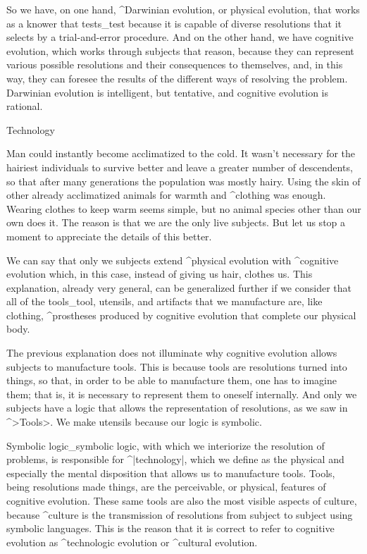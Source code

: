 So we have, on one hand, ^{Darwinian evolution}, or physical evolution,
that works as a knower that tests_{test} because it is capable of
diverse resolutions that it selects by a trial-and-error procedure. And
on the other hand, we have cognitive evolution, which works through
subjects that reason, because they can represent various possible
resolutions and their consequences to themselves, and, in this way, they
can foresee the results of the different ways of resolving the problem.
Darwinian evolution is intelligent, but tentative, and cognitive
evolution is rational.



\Section Technology

Man could instantly become acclimatized to the cold. It wasn't necessary
for the hairiest individuals to survive better and leave a greater
number of descendents, so that after many generations the population was
mostly hairy. Using the skin of other already acclimatized animals for
warmth and ^{clothing} was enough. Wearing clothes to keep warm seems
simple, but no animal species other than our own does it. The reason is
that we are the only live subjects. But let us stop a moment to
appreciate the details of this better.

We can say that only we subjects extend ^{physical evolution} with
^{cognitive evolution} which, in this case, instead of giving us hair,
clothes us. This explanation, already very general, can be generalized
further if we consider that all of the tools_{tool}, utensils, and
artifacts that we manufacture are, like clothing, ^{prostheses} produced
by cognitive evolution that complete our physical body.

The previous explanation does not illuminate why cognitive evolution
allows subjects to manufacture tools. This is because tools are
resolutions turned into things, so that, in order to be able to
manufacture them, one has to imagine them; that is, it is necessary to
represent them to oneself internally. And only we subjects have a logic
that allows the representation of resolutions, as we saw in ^>Tools>. We
make utensils because our logic is symbolic.

Symbolic logic_{symbolic logic}, with which we interiorize the
resolution of problems, is responsible for ^|technology|, which we
define as the physical and especially the mental disposition that allows
us to manufacture tools. Tools, being resolutions made things, are the
perceivable, or physical, features of cognitive evolution. These same
tools are also the most visible aspects of culture, because ^{culture}
is the transmission of resolutions from subject to subject using
symbolic languages. This is the reason that it is correct to refer to
cognitive evolution as ^{technologic evolution} or ^{cultural
evolution}.


